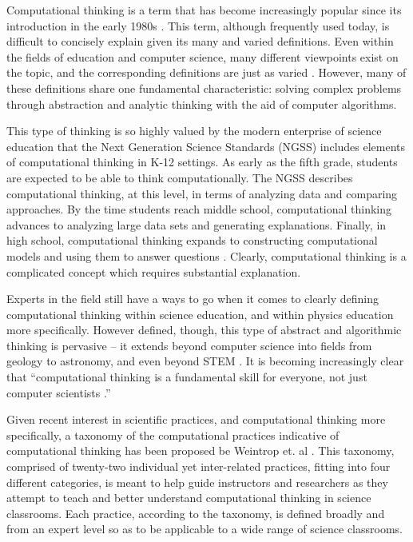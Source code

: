 \documentclass{msuphddissertation}
\begin{document}
\begin{doublespace}
Computational thinking is a term that has become increasingly popular since its introduction in the early 1980s \cite{Papert1981,Wing2006,Wing2008,Aho2012}.  This term, although frequently used today, is difficult to concisely explain given its many and varied definitions.  Even within the fields of education and computer science, many different viewpoints exist on the topic, and the corresponding definitions are just as varied \cite{Grover2013}.  However, many of these definitions share one fundamental characteristic: solving complex problems through abstraction and analytic thinking with the aid of computer algorithms.

This type of thinking is so highly valued by the modern enterprise of science education that the Next Generation Science Standards (NGSS) includes elements of computational thinking in K-12 settings.  As early as the fifth grade, students are expected to be able to think computationally.  The NGSS describes computational thinking, at this level, in terms of analyzing data and comparing approaches.  By the time students reach middle school, computational thinking advances to analyzing large data sets and generating explanations.  Finally, in high school, computational thinking expands to constructing computational models and using them to answer questions \cite{NGSS2012}.  Clearly, computational thinking is a complicated concept which requires substantial explanation.

Experts in the field still have a ways to go when it comes to clearly defining computational thinking within science education, and within physics education more specifically.  However defined, though, this type of abstract and algorithmic thinking is pervasive -- it extends beyond computer science into fields from geology to astronomy, and even beyond STEM \cite{Bundy2007}.  It is becoming increasingly clear that ``computational thinking is a fundamental skill for everyone, not just computer scientists \cite{Wing2006}.''

Given recent interest in scientific practices, and computational thinking more specifically, a taxonomy of the computational practices indicative of computational thinking has been proposed be Weintrop et. al \cite{Weintrop2015}.  This taxonomy, comprised of twenty-two individual yet inter-related practices, fitting into four different categories, is meant to help guide instructors and researchers as they attempt to teach and better understand computational thinking in science classrooms.  Each practice, according to the taxonomy, is defined broadly and from an expert level so as to be applicable to a wide range of science classrooms.


\end{doublespace}
\end{document}
